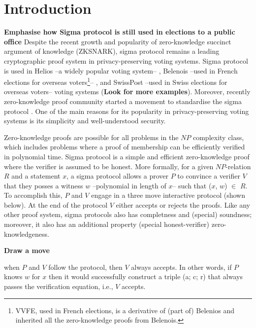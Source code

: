 \documentclass[sigconf]{acmart}
\begin{document}
\section{Introduction}

\textbf{Emphasise how Sigma protocol is still used in elections to a public office}
Despite the recent growth and popularity of zero-knowledge succinct 
argument of knowledge (ZKSNARK), sigma protocol remains a
leading cryptographic proof system in privacy-preserving voting systems. 
Sigma protocol is used in Helios --a widely popular voting system-- \cite{adida2008helios}, 
Belenois --used in French elections for overseas 
voters\footnote{VVFE, used in French elections, is a derivative of (part of) Belenios and 
inherited all the zero-knowledge proofs from Belenois.}-- \cite{cortier2023french}, and 
SwissPost --used in Swiss elections for overseas voters-- voting 
systems \cite{10.1007/978-3-031-15911-4_4} (\textbf{Look for more examples}). 
Moreover, recently zero-knowledge proof community started a movement to standardise
the sigma protocol \cite{ZKProof}.
One of the main reasons for its popularity in privacy-preserving voting systems is its simplicity and 
well-understood security.  

Zero-knowledge proofs are possible for all problems in the $NP$ complexity class, which 
includes problems where a proof of membership can be efficiently verified in polynomial time.
Sigma protocol is a simple and efficient zero-knowledge proof where the verifier  is assumed to be honest. 
More formally, for a given $NP$-relation $R$ and a statement $x$, a sigma protocol allows a prover 
$P$ to convince a verifier $V$ that they posses a witness $w$ --polynomial in length of $x$-- such 
that ($x$, $w$) $\in$ $R$. To accomplish this, $P$ and $V$ engage in a three move 
interactive protocol (shown below). At the end of the protocol $V$ either accepts or rejects the proofs.
Like any other proof system, sigma protocols also has completness and (special) soundness; moreover,  
it also has an additional property (special honest-verifier) zero-knowledgeness. 

\textbf{Draw a move }


when $P$ and $V$ follow the protocol, then $V$ always accepts. In other words, 
if $P$ knows $w$ for $x$ then it would successfully construct a triple 
(a; c; r) that always passes the verification equation, i.e., $V$ accepts.   
\end{document}
